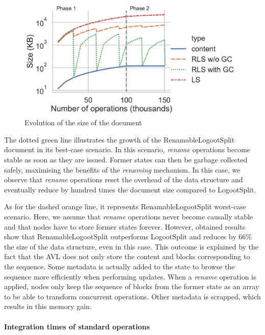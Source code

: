 \documentclass[sigplan,10pt]{acmart}
\begin{document}
\begin{figure}[ht!]
    \centering
    \includegraphics[width=\columnwidth]{img/snapshots-sizes.pdf}
    \caption{Evolution of the size of the document}
    \label{fig:evolution-document-size}
\end{figure}

\begin{sloppypar}
The dotted green line illustrates the growth of the RenamableLogootSplit document in its best-case scenario.
In this scenario, \emph{rename} operations become stable as soon as they are issued.
Former states can then be garbage collected safely, maximising the benefits of the \emph{renaming} mechanism.
In this case, we observe that \emph{rename} operations reset the overhead of the data structure and eventually reduce by hundred times the document size compared to LogootSplit.
\end{sloppypar}

As for the dashed orange line, it represents RenamableLogootSplit worst-case scenario.
Here, we assume that \emph{rename} operations never become causally stable and that nodes have to store former states forever.
However, obtained results show that RenamableLogootSplit outperforms LogootSplit and reduces by 66\% the size of the data structure, even in this case.
This outcome is explained by the fact that the AVL does not only store the content and blocks corresponding to the sequence.
Some metadata is actually added to the state to browse the sequence more efficiently when performing updates.
When a \emph{rename} operation is applied, nodes only keep the sequence of blocks from the former state as an array to be able to transform concurrent operations.
Other metadata is scrapped, which results in this memory gain.

\paragraph{Integration times of standard operations}
\end{document}
